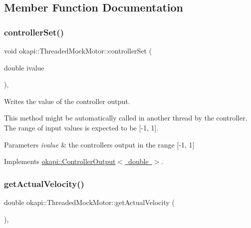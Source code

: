 \subsection{Member Function Documentation}
\mbox{\label{classokapi_1_1ThreadedMockMotor_a42501f640bdc5fe64391c72e4991a3f6}} 
\subsubsection{\texorpdfstring{controllerSet()}{controllerSet()}}
{\footnotesize\ttfamily void okapi\+::\+Threaded\+Mock\+Motor\+::controller\+Set (\begin{DoxyParamCaption}\item[{double}]{ivalue }\end{DoxyParamCaption})\hspace{0.3cm}{\ttfamily [override]}, {\ttfamily [virtual]}}



Writes the value of the controller output. 

This method might be automatically called in another thread by the controller. The range of input values is expected to be \mbox{[}-\/1, 1\mbox{]}.


\begin{DoxyParams}{Parameters}
{\em ivalue} & the controller\textquotesingle{}s output in the range \mbox{[}-\/1, 1\mbox{]} \\
\hline
\end{DoxyParams}


Implements \mbox{\hyperlink{classokapi_1_1ControllerOutput_a360c08f0c10b36f882d6d3100c2cad49}{okapi\+::\+Controller\+Output$<$ double $>$}}.

\mbox{\label{classokapi_1_1ThreadedMockMotor_a40697e4c42239f7c6c411663a030ee71}} 
\subsubsection{\texorpdfstring{getActualVelocity()}{getActualVelocity()}}
{\footnotesize\ttfamily double okapi\+::\+Threaded\+Mock\+Motor\+::get\+Actual\+Velocity (\begin{DoxyParamCaption}{ }\end{DoxyParamCaption})\hspace{0.3cm}{\ttfamily [override]}, {\ttfamily [virtual]}}



